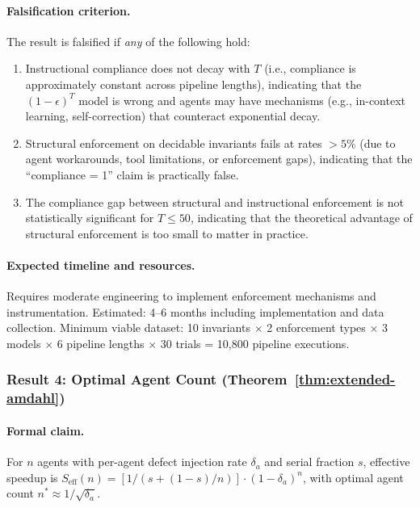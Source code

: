 \paragraph{Falsification criterion.} The result is falsified if \emph{any} of the following hold:
\begin{enumerate}[nosep]
    \item Instructional compliance does not decay with $T$ (i.e., compliance is approximately constant across pipeline lengths), indicating that the $(1-\epsilon)^T$ model is wrong and agents may have mechanisms (e.g., in-context learning, self-correction) that counteract exponential decay.
    \item Structural enforcement on decidable invariants fails at rates $> 5\%$ (due to agent workarounds, tool limitations, or enforcement gaps), indicating that the ``compliance = 1'' claim is practically false.
    \item The compliance gap between structural and instructional enforcement is not statistically significant for $T \leq 50$, indicating that the theoretical advantage of structural enforcement is too small to matter in practice.
\end{enumerate}

\paragraph{Expected timeline and resources.} Requires moderate engineering to implement enforcement mechanisms and instrumentation. Estimated: 4--6 months including implementation and data collection. Minimum viable dataset: 10 invariants $\times$ 2 enforcement types $\times$ 3 models $\times$ 6 pipeline lengths $\times$ 30 trials = 10,800 pipeline executions.

\subsubsection{Result 4: Optimal Agent Count (Theorem~\ref{thm:extended-amdahl})}

\paragraph{Formal claim.} For $n$ agents with per-agent defect injection rate $\delta_a$ and serial fraction $s$, effective speedup is $S_{\text{eff}}(n) = [1/(s + (1-s)/n)] \cdot (1-\delta_a)^n$, with optimal agent count $n^* \approx 1/\sqrt{\delta_a}$.

